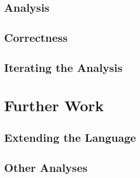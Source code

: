 \documentclass[11pt,a4paper]{article}
\begin{document}
\CodeSubsetSubset
\CodeSubsetOpSubseteq

\subsection{Analysis}

\CodeLiveExpr

\subsection{Correctness}

\subsection{Iterating the Analysis}


\section{Further Work}

\subsection{Extending the Language}

\subsection{Other Analyses}
\end{document}
